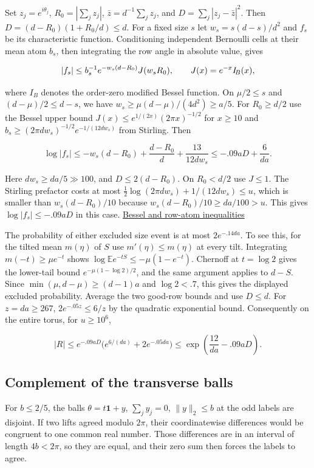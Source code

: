 \documentclass[11pt]{article}
\begin{document}
Set $z_j=e^{i\theta_j}$, $R_0=|\sum_j z_j|$,
$\bar z=d^{-1}\sum_j z_j$, and $D=\sum_j|z_j-\bar z|^2$.
Then $D=(d-R_0)(1+R_0/d)\le d$.
For a fixed size $s$ let $w_s=s(d-s)/d^2$ and $f_s$ be its
characteristic function. Conditioning independent Bernoulli
cells at their mean atom $b_s$, then integrating the row angle
in absolute value, gives

\[
|f_s|\le b_s^{-1}e^{-w_s(d-R_0)}J(w_sR_0),
\qquad J(x)=e^{-x}I_{\negthinspace{}B}(x),
\]

where $I_{\!B}$ denotes the order-zero modified Bessel function.
On $\mu/2\le s$ and $(d-\mu)/2\le d-s$, we have
$w_s\ge\mu(d-\mu)/(4d^2)\ge a/5$.
For $R_0\ge d/2$ use the Bessel upper bound
$J(x)\le e^{1/(2x)}(2\pi x)^{-1/2}$ for $x\ge10$ and
$b_s\ge (2\pi d w_s)^{-1/2}e^{-1/(12d w_s)}$ from Stirling.
Then

\[
\log |f_s|\le -w_s(d-R_0)+\frac{d-R_0}{d}
       +\frac{13}{12d w_s}
\le -.09aD+\frac6{da}.
\]

Here $d w_s\ge da/5\gg100$, and
$D\le2(d-R_0)$. On $R_0<d/2$ use $J\le1$. The
Stirling prefactor costs at most
$\tfrac12\log(2\pi d w_s)+1/(12d w_s)\le u$,
which is smaller than $w_s(d-R_0)/10$ because
$w_s(d-R_0)/10\ge da/100>u$. This gives
$\log |f_s|\le-.09aD$ in this case.
\href{https://github.com/ProgramComputer/open-math-research/blob/main/topics/balanced-arrays/effective-sublinear/direct-row-tail.md}{Bessel and row-atom inequalities}

The probability of either excluded size event is at most
$2e^{-.14da}$. To see this, for the tilted mean $m(\eta)$
of $S$ use $m'(\eta)\le m(\eta)$ at every tilt.
Integrating $m(-t)\ge\mu e^{-t}$ shows
$\log\mathbb E e^{-tS}\le-\mu(1-e^{-t})$.
Chernoff at $t=\log2$ gives the lower-tail bound
$e^{-\mu(1-\log2)/2}$, and the same argument applies to
$d-S$. Since $\min(\mu,d-\mu)\ge(d-1)a$ and $\log2<.7$,
this gives the displayed excluded probability. Average the two
good-row bounds and use $D\le d$. For $z=da\ge267$,
$2e^{-.05z}\le6/z$ by the quadratic exponential bound.
Consequently on the entire torus, for $u\ge10^6$,

\[
|R|\le e^{-.09aD}\big(e^{6/(da)}+2e^{-.05da}\big)
\le \exp\left(\frac{12}{da}-.09aD\right).
\]

\subsection{Complement of the transverse balls}

For $b\le2/5$, the balls $\theta=t\mathbf1+y$,
$\sum_jy_j=0$, $\|y\|_2\le b$ at the odd labels are disjoint.
If two lifts agreed modulo $2\pi$, their coordinatewise differences
would be congruent to one common real number. Those differences
are in an interval of length $4b<2\pi$, so they are equal, and
their zero sum then forces the labels to agree.
\end{document}
